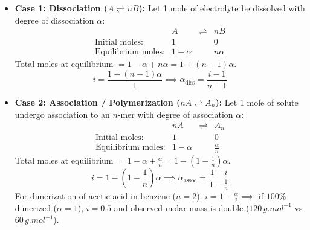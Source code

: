 \documentclass[10pt,twoside,openright]{book}
\begin{document}
\begin{formulabox}
\begin{itemize}
  \item \textbf{Case 1: Dissociation ($A \rightleftharpoons n B$):}
  Let 1 mole of electrolyte be dissolved with degree of dissociation $\alpha$:
  \begin{equation}
    \begin{array}{lcccc}
      & A & \rightleftharpoons & n B \\
      \text{Initial moles:} & 1 & & 0 \\
      \text{Equilibrium moles:} & 1 - \alpha & & n\alpha
    \end{array}
  \end{equation}
  Total moles at equilibrium $= 1 - \alpha + n\alpha = 1 + (n - 1)\alpha$.
  \begin{equation}
    i = \frac{1 + (n - 1)\alpha}{1} \implies \alpha_{\text{diss}} = \frac{i - 1}{n - 1}
  \end{equation}
  \item \textbf{Case 2: Association / Polymerization ($n A \rightleftharpoons A_n$):}
  Let 1 mole of solute undergo association to an $n$-mer with degree of association $\alpha$:
  \begin{equation}
    \begin{array}{lcccc}
      & n A & \rightleftharpoons & A_n \\
      \text{Initial moles:} & 1 & & 0 \\
      \text{Equilibrium moles:} & 1 - \alpha & & \frac{\alpha}{n}
    \end{array}
  \end{equation}
  Total moles at equilibrium $= 1 - \alpha + \frac{\alpha}{n} = 1 - \left(1 - \frac{1}{n}\right)\alpha$.
  \begin{equation}
    i = 1 - \left(1 - \frac{1}{n}\right)\alpha \implies \alpha_{\text{assoc}} = \frac{1 - i}{1 - \frac{1}{n}}
  \end{equation}
  For dimerization of acetic acid in benzene ($n = 2$): $i = 1 - \frac{\alpha}{2} \implies$ if $100\%$ dimerized ($\alpha=1$), $i = 0.5$ and observed molar mass is double ($120\,\si{g.mol^{-1}}$ vs $60\,\si{g.mol^{-1}}$).
\end{itemize}
\end{formulabox}

\end{document}
